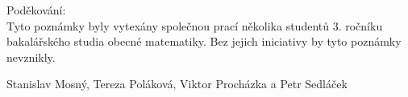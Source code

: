 \newpage
Poděkování:\\

Tyto poznámky byly vytexány společnou prací několika studentů 3. ročníku bakalářského studia obecné matematiky. Bez jejich iniciativy by tyto poznámky nevznikly. \\

\begin{flushright}
Stanislav Mosný, Tereza Poláková, Viktor Procházka a Petr Sedláček
\end{flushright}